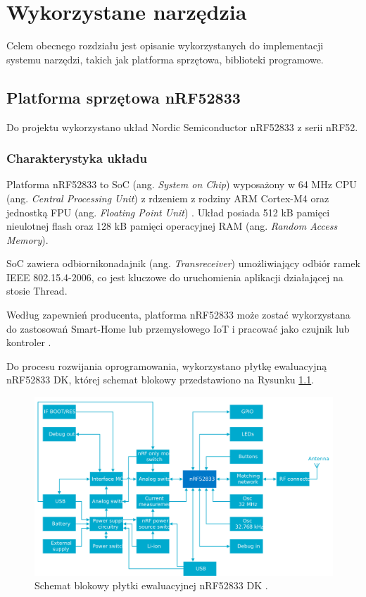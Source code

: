 \chapter{Wykorzystane narzędzia}
\label{cha:narzedzia}

Celem obecnego rozdziału jest opisanie wykorzystanych do implementacji systemu narzędzi, takich jak platforma sprzętowa, biblioteki programowe.

\section{Platforma sprzętowa nRF52833}

Do projektu wykorzystano układ Nordic Semiconductor nRF52833 z serii nRF52.

\subsection{Charakterystyka układu}

    Platforma nRF52833 to SoC (ang. \textit{System on Chip}) wyposażony w 64 MHz CPU (ang. \textit{Central Processing Unit}) z rdzeniem z rodziny ARM Cortex-M4 oraz jednostką FPU (ang. \textit{Floating Point Unit}) \cite{nrf52833-characteristics}.
    Układ posiada 512 kB pamięci nieulotnej flash oraz 128 kB pamięci operacyjnej RAM (ang. \textit{Random Access Memory}).

    SoC zawiera odbiornikonadajnik (ang. \textit{Transreceiver}) umożliwiający odbiór ramek IEEE 802.15.4-2006, co jest kluczowe do uruchomienia aplikacji działającej na stosie Thread.

    Według zapewnień producenta, platforma nRF52833 może zostać wykorzystana do zastosowań Smart-Home lub przemysłowego IoT i pracować jako czujnik lub kontroler \cite{nrf52833-characteristics}.

    Do procesu rozwijania oprogramowania, wykorzystano płytkę ewaluacyjną nRF52833 DK, której schemat blokowy przedstawiono na Rysunku \ref{fig:nrf8233-block-diagram}.

    \begin{figure}[H]
        \centering
        \includegraphics[width=0.8\linewidth]{graphics/external/nrf52833DK_block_diagram.jpg}
        \caption{Schemat blokowy płytki ewaluacyjnej nRF52833 DK \cite{nrf52833-diagram}.}
        \label{fig:nrf8233-block-diagram}
    \end{figure}

